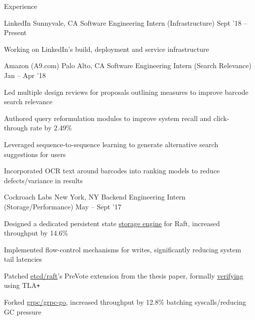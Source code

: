 \documentclass{resume} %
\begin{document}
\begin{rSection}{Experience}
  \begin{rWorkSection}{LinkedIn}
                      {Sunnyvale, CA}
                      {Software Engineering Intern (Infrastructure)}
                      {Sept '18 -- Present}
    \item Working on LinkedIn's build, deployment and service infrastructure
  \end{rWorkSection}

  \begin{rWorkSection}{Amazon (A9.com)}
                     {Palo Alto, CA}
                     {Software Engineering Intern (Search Relevance)}
                     {Jan -- Apr '18}
    \item Led multiple design reviews for proposals outlining measures to
      improve barcode search relevance
    \item Authored query reformulation modules to improve system recall and
      click-through rate by 2.49\%
    \item Leveraged sequence-to-sequence learning to generate alternative
      search suggestions for users
    \item Incorporated OCR text around barcodes into ranking models to reduce
      defects/variance in results
  \end{rWorkSection}

  \begin{rWorkSection}{Cockroach Labs}
                     {New York, NY}
                     {Backend Engineering Intern (Storage/Performance)}
                     {May -- Sept '17}
    \item Designed a dedicated persistent state
      \href{https://github.com/cockroachdb/cockroach/pull/16361}{\underline
      {storage engine}} for Raft, increased throughput by 14.6\%
    \item Implemented flow-control mechanisms for writes, significantly reducing
      system tail latencies
    \item Patched
      \href{https://github.com/coreos/etcd/pull/8288}{\underline{etcd/raft}}'s
      PreVote extension from the thesis paper, formally
      \href{https://github.com/irfansharif/raft.tla/commit/22b05818b6bcfe6719a708f2270a1308fecbc0fa}{\underline {verifying}}
      using TLA\texttt{+}
    \item Forked \href{https://github.com/irfansharif/grpc-go}{\underline{grpc/grpc-go}},
      increased throughput by 12.8\% batching syscalls/reducing GC pressure
  \end{rWorkSection}


\end{rSection}
\end{document}
